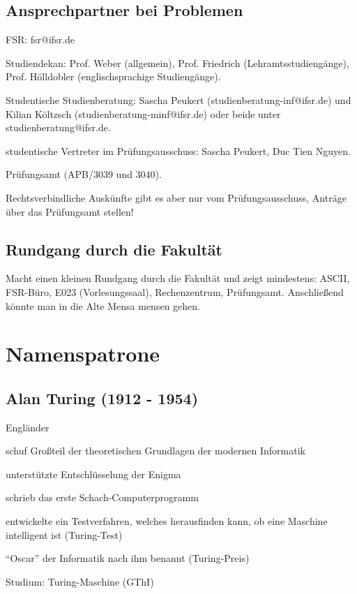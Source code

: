 \documentclass[a4paper,12pt]{report}
\begin{document}
\section{Ansprechpartner bei Problemen}
\begin{itemize*}
	\item FSR: fsr@ifsr.de
	\item Studiendekan: Prof. Weber (allgemein), Prof. Friedrich (Lehramtsstudiengänge), Prof. Hölldobler (englischsprachige Studiengänge).
	\item Studentische Studienberatung: Sascha Peukert (studienberatung-inf@ifsr.de) und Kilian Költzsch (studienberatung-minf@ifsr.de) oder beide unter studienberatung@ifsr.de.
	\item studentische Vertreter im Prüfungsausschuss: Sascha Peukert, Duc Tien Nguyen.
	\item Prüfungsamt (APB/3039 und 3040).
	\item Rechtsverbindliche Auskünfte gibt es aber nur vom Prüfungsausschuss, Anträge über das Prüfungsamt stellen!
\end{itemize*}

\section{Rundgang durch die Fakultät}
Macht einen kleinen Rundgang durch die Fakultät und zeigt mindestens: ASCII, FSR-Büro, E023 (Vorlesungssaal), Rechenzentrum, Prüfungsamt.
Anschließend könnte man in die Alte Mensa mensen gehen.

\chapter{Namenspatrone}
\section{Alan Turing (1912 - 1954)}
\begin{itemize*}
	\item Engländer
	\item schuf Großteil der theoretischen Grundlagen der modernen Informatik
	\item unterstützte Entschlüsselung der Enigma
	\item schrieb das erste Schach-Computerprogramm
	\item entwickelte ein Testverfahren, welches herausfinden kann, ob eine Maschine intelligent ist (Turing-Test)
	\item ``Oscar'' der Informatik nach ihm benannt (Turing-Preis)
	\item Studium: Turing-Maschine (GThI)
\end{itemize*}
\end{document}

